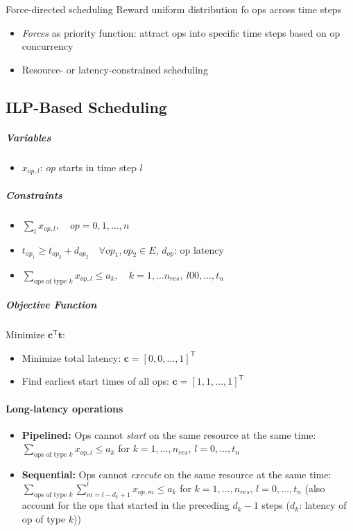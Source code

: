 \documentclass[a4paper]{article}
\begin{document}
\begin{mainbox}{Force-directed scheduling}
    Reward uniform distribution fo ops across time steps
    \begin{itemize}
        \item \emph{Forces} as priority function: attract ops into specific time steps based on op concurrency
        \item Resource- or latency-constrained scheduling
    \end{itemize}
\end{mainbox}

\subsection{ILP-Based Scheduling}

\subparagraph{Variables}
\begin{itemize}
    \item $x_{op, l}$: $op$ starts in time step $l$
\end{itemize}

\subparagraph{Constraints}
\begin{itemize}
    \item $\sum_l x_{op, l}, \quad op = 0, 1, \dots, n$
    \item $t_{op_1} \geq t_{op_2} + d_{op_2} \quad \forall op_1, op_2 \in E$, $d_{op}$: op latency
    \item $\sum_{\text{ops of type } k} x_{op, l} \leq a_k, \quad k = 1, \dots n_{res}, \ l 0 0, \dots, t_n$
\end{itemize}

\subparagraph{Objective Function}
Minimize $\mathbf{c}^\mathsf{T} \mathbf{t}$:
\begin{itemize}
    \item Minimize total latency: $\mathbf{c} = [0, 0, \dots, 1]^\mathsf{T}$
    \item Find earliest start times of all ops: $\mathbf{c} = [1, 1, \dots, 1]^\mathsf{T}$
\end{itemize}

\paragraph{Long-latency operations}
\begin{itemize}
    \item \textbf{Pipelined:} Ops cannot \emph{start} on the same resource at the same time: $\sum_{\text{ops of type } k} x_{op, l} \leq a_k$ for $k = 1, \dots, n_{res}$, $l = 0, \dots, t_n$
    \item \textbf{Sequential:} Ops cannot \emph{execute} on the same resource at the same time: $\sum_{\text{ops of type } k} \sum_{m = l - d_k + 1}^l x_{op, m} \leq a_k$ for $k = 1, \dots, n_{res}$, $l = 0, \dots, t_n$ (also account for the ops that started in the preceding $d_k - 1$ steps ($d_k$: latency of op of type $k$))
\end{itemize}
\end{document}
